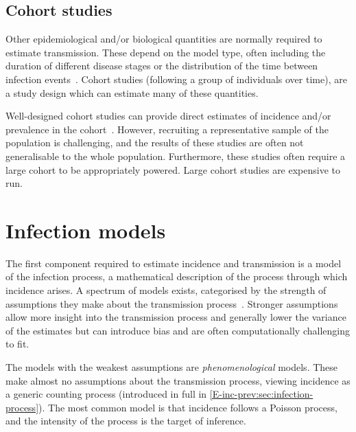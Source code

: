 \documentclass[thesis.tex]{subfiles}
\begin{document}
\subsection{Cohort studies}

Other epidemiological and/or biological quantities are normally required to estimate transmission.
These depend on the model type, often including the duration of different disease stages or the distribution of the time between infection events~\autocite{wallingaGI,dankwaStructural}.
Cohort studies (following a group of individuals over time), are a study design which can estimate many of these quantities.

Well-designed cohort studies can provide direct estimates of incidence and/or prevalence in the cohort~\autocite[chapter 7]{lashModern}.
However, recruiting a representative sample of the population is challenging, and the results of these studies are often not generalisable to the whole population.
Furthermore, these studies often require a large cohort to be appropriately powered.
Large cohort studies are expensive to run.

\section{Infection models}

The first component required to estimate incidence and transmission is a model of the infection process, a mathematical description of the process through which incidence arises.
A spectrum of models exists, categorised by the strength of assumptions they make about the transmission process~\autocite{beckerCOVIDmodels}.
Stronger assumptions allow more insight into the transmission process and generally lower the variance of the estimates but can introduce bias and are often computationally challenging to fit.

The models with the weakest assumptions are \emph{phenomenological} models.
These make almost no assumptions about the transmission process, viewing incidence as a generic counting process (introduced in full in \cref{E-inc-prev:sec:infection-process}).
The most common model is that incidence follows a Poisson process, and the intensity of the process is the target of inference.
\end{document}
